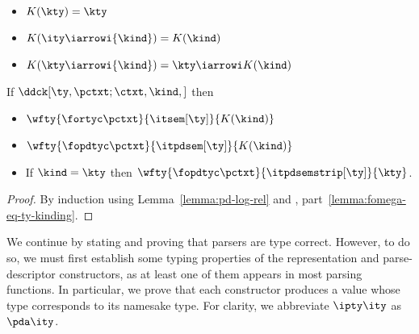 \begin{definition}
\begin{itemize}
\item $K(\kty)        = \kty$
\item $K(\ity \iarrowi {\kind}) = K(\kind)$
\item $K(\kty \iarrowi {\kind}) = \kty \iarrowi K(\kind)$
\end{itemize}
\end{definition}

\begin{lemma}
If $\ddck[\ty,\pctxt;\ctxt,\kind,]$ then 
\begin{itemize}
\item $\wfty{\fortyc \pctxt}{\itsem[\ty]}{K(\kind)}$
\item $\wfty{\fopdtyc \pctxt}{\itpdsem[\ty]}{K(\kind)}$
\item If $\kind = \kty$ then $\wfty {\fopdtyc \pctxt}{\itpdsemstrip[\ty]}{\kty}$.
\end{itemize}
\label{lemma:rep-ty-well-form}
\end{lemma}

\begin{proof}
  By induction using Lemma~\ref{lemma:pd-log-rel} and
  , part~\ref{lemma:fomega-eq-ty-kinding}.
\end{proof}

We continue by stating and proving that parsers are type correct.
However, to do so, we must first establish some typing properties of
the representation and parse-descriptor constructors, as at least one of them appears in most
parsing functions. In particular, we prove that each constructor
produces a value whose type corresponds to its namesake \ddc{}
type. For clarity, we abbreviate $\ipty \ity$ as $\pda \ity$.

